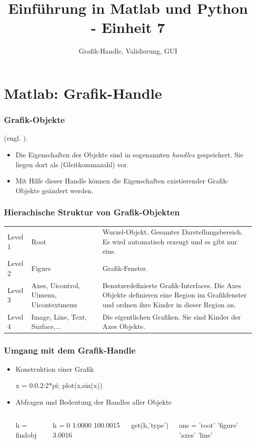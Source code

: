 \documentclass[hyperref={xetex}]{beamer}
\title{Einführung in Matlab und Python - Einheit 7}
\subtitle{Grafik-Handle, Validierung, GUI}
\begin{document}
\titlepage

%
%

\section{Matlab: Grafik-Handle}
\begin{frame}[fragile]\frametitle{Grafik-Objekte}
(engl. ). 
\begin{itemize}
\item Die Eigenschaften  der Objekte sind  in  sogenannten
{\it handles} gespeichert. Sie liegen dort als 
(Gleitkommazahl) vor.
\item Mit Hilfe dieser Handle können die Eigenschaften 
existierender Grafik-Objekte geändert werden.    
\end{itemize}
\end{frame}
%
%
\begin{frame}[fragile]\frametitle{Hierachische Struktur von Grafik-Objekten}
\begin{tabular}{lp{3cm}p{7cm}}
Level 1 & Root & Wurzel-Objekt. Gesamter Darstellungsbereich. Es wird automatisch erzeugt und es gibt nur eins.\\

Level 2 & Figure & Grafik-Fenster. \\

Level 3 & Axes, Uicontrol, Uimenu, Uicontextmenu & Benutzerdefinierte Grafik-Interfaces. 
Die Axes Objekte definieren eine Region im Grafikfenster und ordnen ihre Kinder in
dieser Region an.\\

Level 4 & Image, Line, Text, Surface,... & Die eigentlichen Grafiken. Sie sind Kinder der Axes Objekte.\\
\end{tabular}
\end{frame}
% 
%
\begin{frame}[fragile]\frametitle{Umgang mit dem Grafik-Handle}
\begin{itemize}
\item Konstruktion einer Grafik
\begin{matlabin}
x = 0:0.2:2*pi;
plot(x,sin(x))
\end{matlabin}
\item Abfragen und Bedeutung der Handles aller Objekte\\
\begin{columns}[t]
\begin{matlabin}
h = findobj
\end{matlabin}
\begin{matlab}
h =
         0
    1.0000
  100.0015
    3.0016
\end{matlab}
\begin{matlabin}
get(h,'type')
\end{matlabin}
\begin{matlab}
ans = 
    'root'
    'figure'
    'axes'
    'line'
\end{matlab} 
\end{columns}
\end{itemize}
\end{frame}
\end{document}
